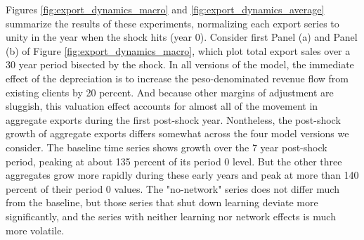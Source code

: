 \documentclass[12pt]{article}
\begin{document}
%

Figures \ref{fig:export_dynamics_macro} and \ref{fig:export_dynamics_average}
summarize the results of these experiments, normalizing each export series
to unity in the year when the shock hits (year 0). Consider first Panel (a)
and Panel (b) of Figure \ref{fig:export_dynamics_macro}, which plot total
export sales over a 30 year period bisected by the shock. In all versions of
the model, the immediate effect of the depreciation is to increase the
peso-denominated revenue flow from existing clients by 20 percent. And
because other margins of adjustment are sluggish, this valuation effect
accounts for almost all of the movement in aggregate exports during the
first post-shock year. Nontheless, the post-shock growth of aggregate
exports differs somewhat across the four model versions we consider. The
baseline time series shows growth over the 7 year post-shock period, peaking
at about 135 percent of its period 0 level. But the other three aggregates
grow more rapidly during these early years and peak at more than 140 percent
of their period 0 values. The "no-network" series does not differ much from
the baseline, but those series that shut down learning deviate more
significantly, and the series with neither learning nor network effects is
much more volatile.
\end{document}
